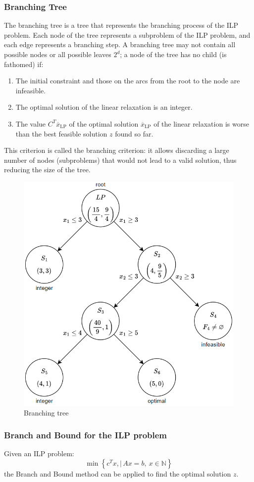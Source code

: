 \subsubsection{Branching Tree}
The branching tree is a tree that represents the branching process of the ILP problem.
Each node of the tree represents a subproblem of the ILP problem, and each edge represents a branching step.
A branching tree may not contain all possible nodes or all possible leaves $2^d$;
a node of the tree has no child (is fathomed) if:
\begin{enumerate}
    \item The initial constraint and those on the arcs from the root to the node are infeasible.
    \item The optimal solution of the linear relaxation is an integer.
    \item The value $C^T \overline{x}_{\text{LP}}$ of the optimal solution $\overline{x}_{\text{LP}}$ of the linear relaxation is worse than the best feasible solution $z$ found so far.
\end{enumerate}
This criterion is called the branching criterion: it allows discarding a large number of nodes (subproblems) that would not lead to a valid solution, thus reducing the size of the tree.

\begin{figure}[H]
    \centering
    \includegraphics[width=0.25\linewidth]{images/ilp3.png}
    \caption{Branching tree}
\end{figure}

\subsubsection{Branch and Bound for the ILP problem}
Given an ILP problem:
\[ \min\left\{ c^T x, \mid\, Ax = b, \ x \in \mathbb{N} \right\} \]
the Branch and Bound method can be applied to find the optimal solution $z$.
